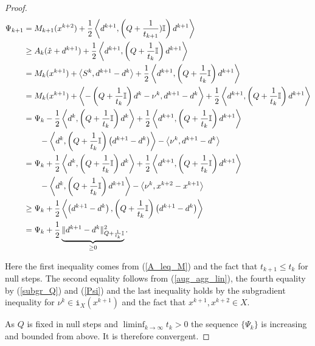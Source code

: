 \begin{proof}
\begin{equation}
\begin{split}
		\Psi_{k+1} &= M_{k+1}(x^{k+2})+\frac{1}{2}\left\langle d^{k+1},\left(Q+\frac{1}{t_{k+1}})\mathbb{I} \right)d^{k+1}\right\rangle \\
		&\geq A_k(\hat{x}+d^{k+1})+\frac{1}{2}\left\langle d^{k+1},\left(Q+\frac{1}{t_k}\mathbb{I}\right)d^{k+1}\right\rangle \\
		&= M_k(x^{k+1})+\left\langle S^k,d^{k+1}-d^{k} \right\rangle +\frac{1}{2}\left\langle d^{k+1},\left(Q+\frac{1}{t_k}\mathbb{I}\right)d^{k+1}\right\rangle \\
		&= M_k(x^{k+1})+\left\langle -\left( Q+\frac{1}{t_k}\mathbb{I}\right)d^k - \nu^k,d^{k+1}-d^{k} \right\rangle +\frac{1}{2}\left\langle d^{k+1},\left(Q+\frac{1}{t_k}\mathbb{I}\right)d^{k+1}\right\rangle \\
		&= \Psi_k - \frac{1}{2}\left\langle d^{k},\left(Q+\frac{1}{t_k}\mathbb{I}\right)d^{k}\right\rangle + \frac{1}{2}\left\langle d^{k+1},\left(Q+\frac{1}{t_k}\mathbb{I}\right)d^{k+1}\right\rangle \\
		& \qquad -\left\langle d^{k},\left(Q+\frac{1}{t_k}\mathbb{I}\right)\left(d^{k+1} - d^{k}\right)\right\rangle - \left\langle \nu^k, d^{k+1}-d^{k}\right\rangle\\
		&= \Psi_k + \frac{1}{2}\left\langle d^{k},\left(Q+\frac{1}{t_k}\mathbb{I}\right)d^{k}\right\rangle + \frac{1}{2}\left\langle d^{k+1},\left(Q+\frac{1}{t_k}\mathbb{I}\right)d^{k+1}\right\rangle \\
		& \qquad -\left\langle d^{k},\left(Q+\frac{1}{t_k}\mathbb{I}\right)d^{k+1}\right\rangle - \left\langle \nu^k, x^{k+2}-x^{k+1}\right\rangle\\
		&\geq \Psi_k + \frac{1}{2}\left\langle\left(d^{k+1}-d^{k}\right),\left(Q+\frac{1}{t_k}\mathbb{I}\right)\left(d^{k+1} - d^{k}\right)\right\rangle \\
		& =\Psi_k + \frac{1}{2}\underbrace{\|d^{k+1}-d^k\|^2_{Q+\frac{ 1}{t_k}\mathbb{I}}}_{\geq 0}.
	\label{Psi_increase}
\end{split}
\end{equation}
	
Here the first inequality comes from (\ref{A_leq_M}) and the fact that \(t_{k+1} \leq t_{k}\) for null steps. The second equality follows from (\ref{aug_agg_lin}), the fourth equality by (\ref{subgr_Q}) and (\ref{Psi}) and the last inequality holds by the subgradient inequality for \(\nu^k \in \mathtt{i}_X(x^{k+1})\) and the fact that \(x^{k+1},x^{k+2} \in X\).

As \(Q\) is fixed in null steps and  \(\liminf_{k \to \infty} t_k > 0\) the sequence \(\{\Psi_k\}\) is increasing and bounded from above. It is therefore convergent.


\end{proof}
